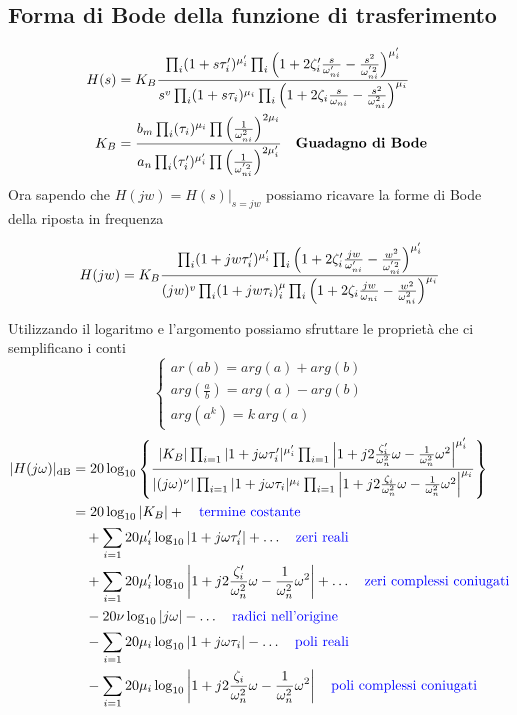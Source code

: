 \documentclass{article}
\theoremstyle{definition}
\begin{document}
\subsection{Forma di Bode della funzione di trasferimento }
\begin{align*}
	H(s)&=K_B\frac{\prod_i (1+s\tau_i')^{\mu'_i}\prod_i\left(1+2\zeta'_i \frac{s}{\omega'_{ni}}-\frac{s^2}{\omega^{'2}_{ni} }\right)^{\mu'_{i}}}{s^v \prod_i (1+s\tau_i)^{\mu_i}\prod_i\left(1+2\zeta_i \frac{s}{\omega_{ni}}-\frac{s^2}{\omega^{2}_{ni}} \right) ^{\mu_i}} \\
	K_B&=\frac{b_m \prod_i (\tau_i)^{\mu_i}\prod\left(\frac{1}{\omega^2_{ni}}\right)^{2\mu_i}}{a_n \prod_i (\tau'_i)^{\mu'_i}\prod\left(\frac{1}{\omega^{'2}_{ni}}\right)^{2\mu'_i}} \ \ \ \text{\textbf{Guadagno di Bode }}
\end{align*}
Ora sapendo che $H(jw)=H(s)\Big|_{s=jw}$ possiamo ricavare la forme di Bode della riposta in frequenza 
\begin{tcolorbox}
$$	H(jw)=K_B\frac{\prod_i (1+jw\tau_i')^{\mu'_i}\prod_i\left(1+2\zeta'_i \frac{jw}{\omega'_{ni}}-\frac{w^2}{\omega^{'2}_{ni} }\right)^{\mu'_{i}}}{(jw)^v \prod_i (1+jw\tau_i)^\mu_i\prod_i\left(1+2\zeta_i \frac{jw}{\omega_{ni}}-\frac{w^2}{\omega^{2}_{ni}} \right) ^{\mu_i}} \\$$
\end{tcolorbox}
Utilizzando il logaritmo e l'argomento possiamo sfruttare le proprietà che ci semplificano i conti 
$$\begin{cases}
	ar(ab)=arg(a)+arg(b) \\
	arg(\frac{a}{b})=arg(a)-arg(b)\\
	arg(a^k)=k\ arg(a)
\end{cases}$$
\begin{align*}
	|H(j\omega)|_{\text{dB}} &= 20 \log_{10} \left\{ 
	\frac{
		|K_B| \prod_{i=1} |1 + j\omega\tau_i'|^{\mu_i'} \prod_{i=1} \left|1 + j2\frac{\zeta_i'}{\omega_n^2}\omega - \frac{1}{\omega_n^2}\omega^2\right|^{\mu_i'}
	}{
		|(j\omega)^\nu| \prod_{i=1} |1 + j\omega\tau_i|^{\mu_i} \prod_{i=1} \left|1 + j2\frac{\zeta_i}{\omega_n^2}\omega - \frac{1}{\omega_n^2}\omega^2\right|^{\mu_i}
	} 
	\right\} \\
	&= 20 \log_{10} |K_B| + \quad  \text{\textcolor{blue}{termine costante}} \\
	&\quad + \sum_{i=1} 20\mu_i' \log_{10}|1 + j\omega\tau_i'| + \ldots \quad \text{\textcolor{blue}{zeri reali}} \\
	&\quad + \sum_{i=1} 20\mu_i' \log_{10}\left|1 + j2\frac{\zeta_i'}{\omega_n^2}\omega - \frac{1}{\omega_n^2}\omega^2\right| + \ldots \quad \text{\textcolor{blue}{zeri complessi coniugati}} \\
	&\quad -20\nu \log_{10}|j\omega| - \ldots \quad \text{\textcolor{blue}{radici nell'origine}} \\
	&\quad - \sum_{i=1} 20\mu_i \log_{10}|1 + j\omega\tau_i| - \ldots \quad \text{\textcolor{blue}{poli reali}} \\
	&\quad - \sum_{i=1} 20\mu_i \log_{10}\left|1 + j2\frac{\zeta_i}{\omega_n^2}\omega - \frac{1}{\omega_n^2}\omega^2\right| \quad \text{\textcolor{blue}{poli complessi coniugati}}
\end{align*}
\end{document}
